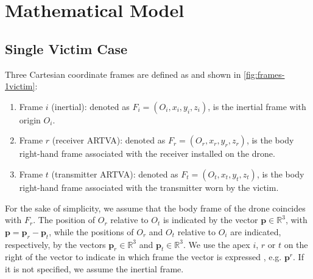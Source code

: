 \chapter{Mathematical Model}

\section{Single Victim Case}
Three Cartesian coordinate frames are defined as \cite{main} and shown in \ref{fig:frames-1victim}:
\begin{enumerate}[label=(\roman*)]
    \item Frame $i$ (inertial): denoted as $F_i = (O_i, x_i, y_i, z_i)$, is the inertial frame with origin $O_i$.
    \item Frame $r$ (receiver ARTVA): denoted as $F_r = (O_r, x_r, y_r, z_r)$, is the body right-hand frame associated with the receiver installed on the drone.
    \item Frame $t$ (transmitter ARTVA): denoted as $F_t = (O_t, x_t, y_t, z_t)$, is the body right-hand frame associated with the transmitter worn by the victim.
\end{enumerate}
For the sake of simplicity, we assume that the body frame of the drone coincides with $F_r$. The position of $O_r$ relative to $O_t$ is indicated by the vector $\mathbf{p} \in \mathbb{R}^3$, with $\mathbf{p} = \mathbf{p}_r - \mathbf{p}_t$, while the positions of $O_r$ and $O_t$ relative to $O_i$ are indicated, respectively, by the vectors $\mathbf{p}_r \in \mathbb{R}^3$ and $\mathbf{p}_t \in \mathbb{R}^3$.
We use the apex $i$, $r$ or $t$ on the right of the vector to indicate in which frame the vector is expressed , e.g. $\mathbf{p}^r$. If it is not specified, we assume the inertial frame.
